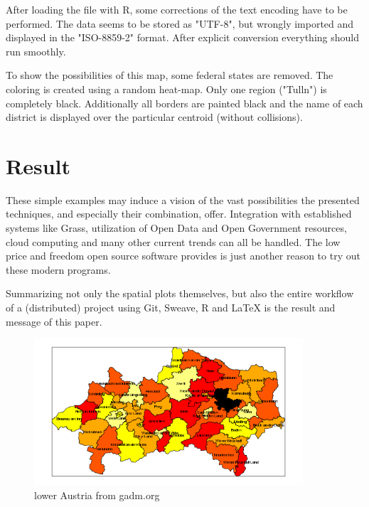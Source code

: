 \documentclass{ifacconf}
\begin{document}
After loading the file with R, some corrections of the text encoding have
to be performed. The data seems to be stored as "UTF-8", but wrongly
imported and displayed in the "ISO-8859-2" format. After explicit conversion
everything should run smoothly.

To show the possibilities of this map, some federal states are removed. 
The coloring is created using a random heat-map. Only one region ("Tulln")
is completely black. Additionally all borders are painted black and the name
of each district is displayed over the particular centroid (without collisions).



\section{Result}
These simple examples 
may induce a vision  of the vast possibilities the presented techniques, and 
especially their combination, offer. Integration with established systems like Grass,
utilization of Open Data and Open Government resources, cloud computing and many other 
current trends can all be handled. The low price and
freedom open source software provides is just another reason to try out
these modern programs.

Summarizing not only the spatial plots themselves, but also the entire workflow
of a (distributed) project using Git, Sweave, R and LaTeX is the result and 
message of this paper.



\begin{figure}[h]
\begin{center}
\includegraphics[width=10cm]{pics/northAustria.png}    %
\caption{lower Austria from gadm.org} 
\label{fig:noe}
\end{center}
\end{figure}

   
\end{document}
